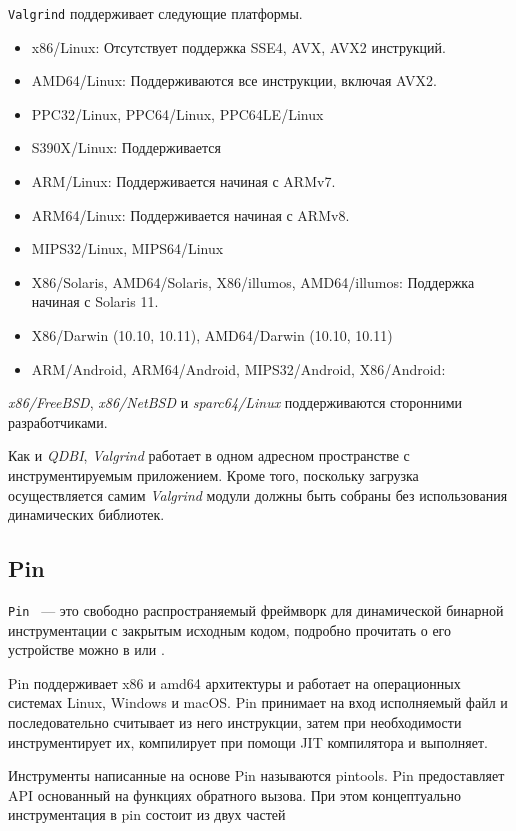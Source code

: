 \texttt{Valgrind} поддерживает следующие платформы.

\begin{itemize}

    \item x86/Linux: Отсутствует поддержка SSE4, AVX, AVX2 инструкций.
    \item AMD64/Linux: Поддерживаются все инструкции, включая AVX2.
    \item PPC32/Linux, PPC64/Linux, PPC64LE/Linux
    \item S390X/Linux: Поддерживается
    \item ARM/Linux: Поддерживается начиная с ARMv7.
    \item ARM64/Linux: Поддерживается начиная с ARMv8.
    \item MIPS32/Linux, MIPS64/Linux
    \item X86/Solaris, AMD64/Solaris, X86/illumos, AMD64/illumos: Поддержка начиная с Solaris 11.
    \item X86/Darwin (10.10, 10.11), AMD64/Darwin (10.10, 10.11)
    \item ARM/Android, ARM64/Android, MIPS32/Android, X86/Android:
\end{itemize}

\emph{x86/FreeBSD}, \emph{x86/NetBSD} и \emph{sparc64/Linux} поддерживаются сторонними разработчиками.

Как и \emph{QDBI}, \emph{Valgrind} работает в одном адресном пространстве с инструментируемым приложением. Кроме того, поскольку загрузка осуществляется самим \emph{Valgrind} модули должны быть собраны без использования динамических библиотек.

\subsection{Pin}

\texttt{Pin} ~--- это свободно распространяемый фреймворк для динамической бинарной инструментации с закрытым исходным кодом, подробно прочитать о его устройстве можно в \cite{PIN} или \cite{PBA}.

Pin поддерживает x86 и amd64 архитектуры и работает на операционных системах Linux, Windows и macOS. Pin принимает на вход исполняемый файл и последовательно считывает из него инструкции, затем при необходимости инструментирует их, компилирует при помощи JIT компилятора и выполняет.

Инструменты написанные на основе Pin называются pintools. Pin предоставляет API основанный на функциях обратного вызова. При этом концептуально инструментация в pin состоит из двух частей


